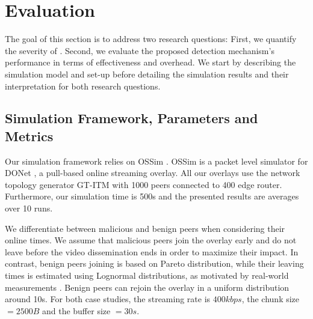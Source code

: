 \section{Evaluation}
\label{sec:eval}

The goal of this section is to address two research questions: 
First, we quantify the severity of \drop. 
Second, we evaluate the proposed detection mechanism's performance in terms of effectiveness and overhead. 
We start by describing the simulation model and set-up before detailing the simulation results and their interpretation for both research questions.


\subsection{Simulation Framework, Parameters and Metrics}
Our simulation framework relies on OSSim \cite{nguyen2013ossim}. 
OSSim is a packet level simulator for DONet \cite{zhang2005coolstreaming}, a pull-based online streaming overlay.
All our overlays use the network topology generator GT-ITM \cite{GT} with 1000 peers connected to 400 edge router. Furthermore, our simulation time is 500s and the presented results are averages over 10 runs. 

We differentiate between malicious and benign peers when considering their online times. 
We assume that malicious peers join the overlay early and do not leave before the video dissemination ends in order to maximize their impact. 
In contrast,  benign peers joining is based on Pareto distribution, while their leaving times is estimated using Lognormal distributions, as motivated by real-world measurements \cite{distribution}.
Benign peers can rejoin the overlay in a uniform distribution around 10s. For both case studies, the streaming rate is $400kbps$, the chunk size $=2500B$ and the buffer size $=30s$.


% 
% 
% 
%   

